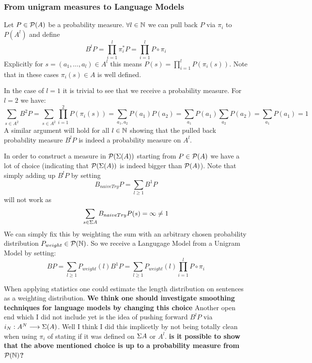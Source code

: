 \documentclass[11pt]{article}
\begin{document}

\subsubsection{From unigram measures to Language Models}
Let $P \in \mathcal{P}(A)$ be a probability measure. 
$\forall l \in {\mathbb N}$ we can pull back $P$ via $\pi_i$ to $P(A^l)$ and define
\[B^lP = \prod_{i=1}^l \pi_i^* P = \prod_{i=1}^l P \circ \pi_i \]
Explicitly for $s = (a_1,\dots,a_l) \in A^l$ this means $P(s)=\prod_{i=1}^l P(\pi_i(s))$.
Note that in these cases $\pi_i(s) \in A$ is well defined.

In the case of $l=1$ it is trivial to see that we receive a probability measure.
For $l=2$ we have:
\[\sum_{s\in A^2}B^2P = \sum_{s\in A^2} \prod_{i=1}^2 P(\pi_i(s)) = \sum_{a_1,a_2} P(a_1)P(a_2) = \sum_{a_1} P(a_1) \sum_{a_2} P(a_2) = \sum_{a_1} P(a_1) = 1\]
A similar argument will hold for all $l \in {\mathbb N}$ showing that the pulled back probability measure $B^lP$ is indeed a probability measure on $A^l$. 

In order to construct a measure in $\mathcal{P}(\Sigma(A))$ starting from $P\in \mathcal{P}(A)$ we have a lot of choice (indicating that $\mathcal{P}(\Sigma(A))$ is indeed bigger than $\mathcal{P}(A)$).
Note that simply adding up $B^lP$ by setting 
\[B_{naiveTry}P = \sum_{l\geq 1}B^1P\] 
will not work as 
\[\sum_{s\in \Sigma A}B_{naiveTry}P(s) = \infty \neq 1\]
We can simply fix this by weighting the sum with an arbitrary chosen probability distribution $P_{weight}\in \mathcal{P}({\mathbb N})$.
So we receive a Langugage Model from a Unigram Model by setting:
\[BP = \sum_{l\geq 1}  P_{weight}(l)B^1P = \sum_{l\geq 1} P_{weight}(l)\prod_{i=1}^l P \circ \pi_i \]

When applying statistics one could estimate the length distribution on sentences as a weighting distribution.
\textbf{We think one should investigate smoothing techniques for language models by changing this choice}
Another open end which I did not include yet is the idea of pushing forward $B^lP$ via $i_N:A^N \longrightarrow \Sigma(A)$. Well I think I did this implicetly by not being totally clean when using $\pi_i$ of stating if it was defined on $\Sigma A$ or $A^l$.
\textbf{is it possible to show that the above mentioned choice is up to a probability measure from $\mathcal{P}({\mathbb N})$?}

\end{document}
